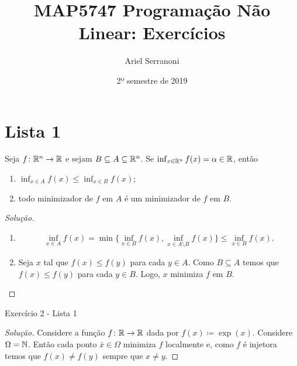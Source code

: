 \documentclass[12pt,twoside,a4paper]{article}
\title{MAP5747 Programação Não Linear: Exercícios}
\author{Ariel Serranoni}
\date{2º semestre de 2019}
\begin{document}
\maketitle

\section{Lista 1}

\begin{problema}
  Seja \(f\colon\mathbb{R}^n\to\mathbb{R}\) e sejam
  \(B\subseteq A\subseteq\mathbb{R}^n\). Se
 \(\inf_{x\in\mathbb{R}^n}f(x)=\alpha\in\mathbb{R}\), então
\begin{enumerate}[label=(\roman*)]
\item \(\inf_{x\in A}f(x)\leq\inf_{x\in B}f(x)\);
\item todo minimizador de \(f\) em \(A\) é um minimizador de \(f\)
  em \(B\).
\end{enumerate}
\end{problema}
\begin{proof}[Solução]\hfill
  \begin{enumerate}[label=(\roman*)]
  \item \[\inf_{x\in A} f(x)=
      \min\{\inf_{x\in B}f(x), \inf_{x\in A\setminus B}f(x)\}\leq
      \inf_{x\in B}f(x).\]
  \item Seja \(x\) tal que \(f(x)\leq f(y)\) para cada \(y\in A\). Como
    \(B\subseteq A\) temos que \(f(x)\leq f(y)\) para cada \(y\in B\).
    Logo,
    \(x\) minimiza \(f\) em \(B\).\qedhere
    \end{enumerate}
\end{proof}

\begin{problema}
Exercício 2 - Lista 1
\end{problema}
\begin{proof}[Solução]
  Considere a função \(f\colon\mathbb{R}\to\mathbb{R}\) dada por
  \(f(x)\coloneqq\exp(x)\). Considere \(\Omega=\mathbb{N}\).
  Então cada ponto \(\bar{x}\in\Omega\) minimiza \(f\) localmente e,
  como \(f\) é injetora temos que \(f(x)\not=f(y)\)
  sempre que \(x\not= y\).\qedhere
\end{proof}
\end{document}
